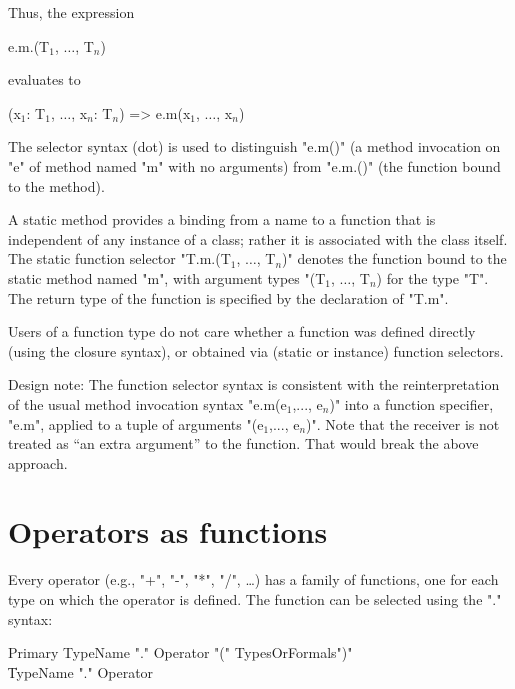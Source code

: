 Thus, the expression

\begin{xtenmath}
e.m.(T$_1$, $\dots$, T$_n$)
\end{xtenmath}

evaluates to

\begin{xtenmath}
(x$_1$: T$_1$, $\dots$, x$_n$: T$_n$) => e.m(x$_1$, $\dots$, x$_n$)
\end{xtenmath}

\begin{note}
The selector syntax (dot) is used to distinguish \xcd"e.m()" (a
method invocation on \xcd"e" of method named \xcd"m" with no arguments)
from \xcd"e.m.()"
(the function bound to the method). 
\end{note}

A static method provides a binding from a name to a function that is
independent of any instance of a class; rather it is associated with the
class itself. The static function selector
\xcdmath"T.m.(T$_1$, $\dots$, T$_n$)" denotes the
function bound to the static method named \xcd"m", with argument types
\xcdmath"(T$_1$, $\dots$, T$_n$) for the type \xcd"T". The return type
of the function is specified by the declaration of \xcd"T.m".

Users of a function type do not care whether a function was defined
directly (using the closure syntax), or obtained via (static or
instance) function selectors.

\begin{note}
Design note: The function selector syntax is consistent with the
reinterpretation of the usual method invocation syntax
\xcdmath"e.m(e$_1$,..., e$_n$)"
into a function specifier, \xcd"e.m", applied to a tuple of arguments
\xcdmath"(e$_1$,..., e$_n$)". Note that the receiver is not
treated as ``an extra argument'' to the
function. That would break the above approach.
\end{note}


\section{Operators as functions}

Every operator (e.g.,
\xcd"+",
\xcd"-",
\xcd"*",
\xcd"/",
\dots) has a family of functions, one for
each type on which the operator is defined. The function can be
selected using the "." syntax:

\begin{grammar}
Primary \: TypeName \xcd"." Operator \xcd"(" TypesOrFormals\opt \xcd")" \\
        \| TypeName \xcd"." Operator \\
\end{grammar}

